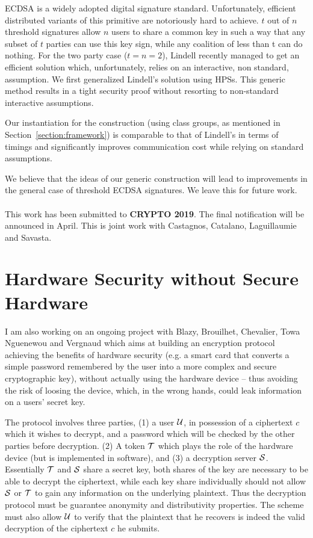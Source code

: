\documentclass[11pt]{llncs}
\begin{document}
ECDSA is a widely adopted digital signature standard. Unfortunately, efficient distributed variants of this primitive are notoriously hard to achieve. $t$ out of $n$ threshold signatures allow $n$ users to share a common key in such a way that any subset of $t$ parties can use this key sign, while any coalition of less than t can do nothing. For the two party case ($t=n=2$), Lindell \cite{C:Lindell17} recently managed to get an efficient solution which, unfortunately, relies on an interactive, non standard, assumption. We first generalized Lindell’s solution using HPSs. This generic method results in a tight security proof without resorting to non-standard interactive assumptions.

Our instantiation for the construction (using class groups, as mentioned in Section~\ref{section:framework}) is comparable to that of Lindell's in terms of timings and significantly improves communication cost while relying on standard assumptions.

We believe that the ideas of our generic construction will lead to improvements in the general case of threshold ECDSA signatures. We leave this for future work.

\paragraph{} This work has been submitted to \textbf{CRYPTO 2019}. The final notification will be announced in April. This is joint work with Castagnos, Catalano, Laguillaumie and Savasta.

\section{Hardware Security without Secure Hardware} 
I am also working on an ongoing project with Blazy, Brouilhet, Chevalier, Towa Nguenewou and Vergnaud which aims at building an encryption protocol achieving the benefits of hardware security (e.g. a smart card that converts a simple password remembered by the user into a more complex and secure cryptographic key), without actually using the hardware device -- thus avoiding the risk of loosing the device, which, in the wrong hands, could leak information on a users' secret key.

The protocol involves three parties, (1) a user $\mathcal{U}$, in possession of a ciphertext $c$ which it wishes to decrypt, and a password which will be checked by the other parties before decryption. (2) A token $\mathcal{T}$ which plays the role of the hardware device (but is implemented in software), and (3) a decryption server $\mathcal{S}$. Essentially $\mathcal{T}$ and $\mathcal{S}$ share a secret key, both shares of the key are necessary to be able to decrypt the ciphertext, while each key share individually should not allow $\mathcal{S}$ or $\mathcal{T}$ to gain any information on the underlying plaintext. Thus the decryption protocol must be guarantee anonymity and distributivity properties. The scheme must also allow $\mathcal{U}$ to verify that the plaintext that he recovers is indeed the valid decryption of the ciphertext $c$ he submits.
\end{document}

